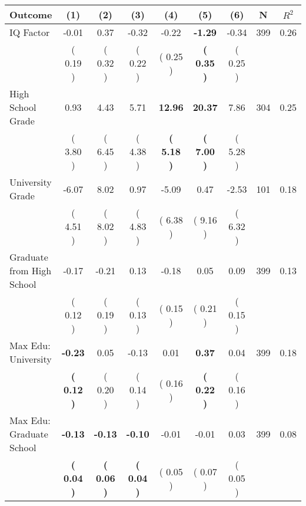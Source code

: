 \begin{tabular}{lcccccccc}
\toprule
 \textbf{Outcome} & \textbf{(1)} & \textbf{(2)} & \textbf{(3)} & \textbf{(4)} & \textbf{(5)} & \textbf{(6)} & \textbf{N} & \textbf{$ R^2$} \\
\midrule
IQ Factor &     -0.01 &      0.37 &     -0.32 &     -0.22 & \textbf{    -1.29} &     -0.34 & 399 &       0.26 \\ 
 & (     0.19 ) & (     0.32 ) & (     0.22 ) & (     0.25 ) & \textbf{(     0.35 )} & (     0.25 ) & \\
High School Grade &      0.93 &      4.43 &      5.71 & \textbf{    12.96} & \textbf{    20.37} &      7.86 & 304 &       0.25 \\ 
 & (     3.80 ) & (     6.45 ) & (     4.38 ) & \textbf{(     5.18 )} & \textbf{(     7.00 )} & (     5.28 ) & \\
University Grade &     -6.07 &      8.02 &      0.97 &     -5.09 &      0.47 &     -2.53 & 101 &       0.18 \\ 
 & (     4.51 ) & (     8.02 ) & (     4.83 ) & (     6.38 ) & (     9.16 ) & (     6.32 ) & \\
Graduate from High School &     -0.17 &     -0.21 &      0.13 &     -0.18 &      0.05 &      0.09 & 399 &       0.13 \\ 
 & (     0.12 ) & (     0.19 ) & (     0.13 ) & (     0.15 ) & (     0.21 ) & (     0.15 ) & \\
Max Edu: University & \textbf{    -0.23} &      0.05 &     -0.13 &      0.01 & \textbf{     0.37} &      0.04 & 399 &       0.18 \\ 
 & \textbf{(     0.12 )} & (     0.20 ) & (     0.14 ) & (     0.16 ) & \textbf{(     0.22 )} & (     0.16 ) & \\
Max Edu: Graduate School & \textbf{    -0.13} & \textbf{    -0.13} & \textbf{    -0.10} &     -0.01 &     -0.01 &      0.03 & 399 &       0.08 \\ 
 & \textbf{(     0.04 )} & \textbf{(     0.06 )} & \textbf{(     0.04 )} & (     0.05 ) & (     0.07 ) & (     0.05 ) & \\
\bottomrule
\end{tabular}
